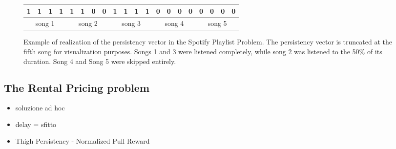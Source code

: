 \begin{figure}[h]
	
	
		\begin{tabular}{cccccccccccccccccccc}
			\hline
			\multicolumn{1}{|c}{1} & 1 & 1 & \multicolumn{1}{c|}{1} & 1 & 1 & 0 & \multicolumn{1}{c|}{0} & 1 & 1 & 1 & \multicolumn{1}{c|}{1} & 0 & 0 & 0 & \multicolumn{1}{c|}{0} & 0 & 0 & 0 & \multicolumn{1}{c|}{0} \\ \hline
			\multicolumn{4}{c}{song 1}                              & \multicolumn{4}{c}{song 2}         & \multicolumn{4}{c}{song 3}         & \multicolumn{4}{c}{song 4}         & \multicolumn{4}{c}{song 5}        
		\end{tabular}



\caption{Example of realization of the persistency vector in the Spotify Playlist Problem. The persistency vector is truncated at the fifth song for visualization purposes. Songs 1 and 3 were listened completely, while song 2 was listened to the 50\% of its duration. Song 4 and Song 5 were skipped entirely.}
\label{bucket_spotify}
\end{figure}






\subsection{The Rental Pricing problem}
\begin{itemize}
	\item soluzione ad hoc
	\item delay = sfitto 
	\item Thigh Persistency - Normalized Pull Reward
\end{itemize}
 	





